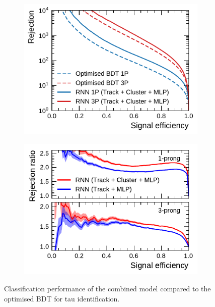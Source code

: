 \begin{figure}[htb]
  \begin{subfigure}[t]{0.48\textwidth}
    \centering
    \includegraphics{./figures/rnn/combined/roc_fixed.pdf}
  \end{subfigure}\hfill
  \begin{subfigure}[t]{0.48\textwidth}
    \centering
    \includegraphics{./figures/rnn/combined/ratios.pdf}
  \end{subfigure}
  \caption{Classification performance of the combined model compared to the
    optimised BDT for tau identification.}
  \label{fig:roc_combined}
\end{figure}

